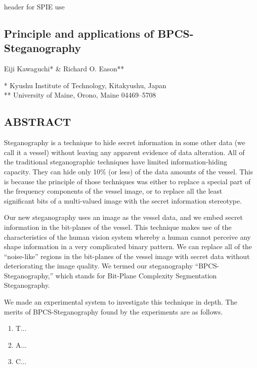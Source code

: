 \documentclass{article}
\begin{document}

header for SPIE use

\begin{center}

\section*{Principle and applications of BPCS-Steganography}

Eiji Kawaguchi* \& Richard O. Eason**

* Kyushu Institute of Technology, Kitakyushu, Japan \\
** University of Maine, Orono, Maine 04469--5708

\subsection*{ABSTRACT}

Steganography is a technique to hide secret information in some other data (we call it a vessel) without leaving any apparent evidence of data alteration. All of the traditional steganographic techniques have limited information-hiding capacity. They can hide only 10\% (or less) of the data amounts of the vessel. This is because the principle of those techniques was either to replace a special part of the frequency components of the vessel image, or to replace all the least significant bits of a multi-valued image with the secret information stereotype.

Our new steganography uses an image as the vessel data, and we embed secret information in the bit-planes of the vessel. This technique makes use of the characteristics of the human vision system whereby a human cannot perceive any shape information in a very complicated binary pattern. We can replace all of the ``noise-like'' regions in the bit-planes of the vessel image with secret data without deteriorating the image quality. We termed our steganography ``BPCS-Steganography,'' which stands for Bit-Plane Complexity Segmentation Steganography.

We made an experimental system to investigate this technique in depth. The merits of BPCS-Steganography found by the experiments are as follows.

\begin{enumerate}
  \item T...
  \item A...
  \item C...
\end{enumerate}
\end{center}
\end{document}
